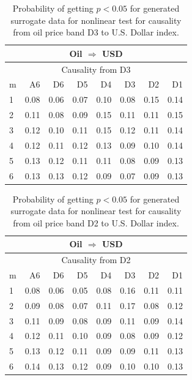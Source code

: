 %
%
\begin{table}[H]
\begin{center}
\begin{tabular}{l|r r r r r r r}
\hline\hline
\multicolumn{8}{c}{Oil $\Rightarrow$ USD}\\
\hline
\multicolumn{8}{c}{Causality from D3}\\
\hline\hline
m & A6 & D6 & D5 & D4 & D3 & D2 & D1 \\
\hline
1 & 0.08 & 0.06 & 0.07 & 0.10 & 0.08 & 0.15 & 0.14 \\
2 & 0.11 & 0.08 & 0.09 & 0.15 & 0.11 & 0.11 & 0.15 \\
3 & 0.12 & 0.10 & 0.11 & 0.15 & 0.12 & 0.11 & 0.14 \\
4 & 0.12 & 0.11 & 0.12 & 0.13 & 0.09 & 0.10 & 0.14 \\
5 & 0.13 & 0.12 & 0.11 & 0.11 & 0.08 & 0.09 & 0.13 \\
6 & 0.13 & 0.13 & 0.12 & 0.09 & 0.07 & 0.09 & 0.13 \\
\hline\hline
\end{tabular}
\caption{Probability of getting $p < 0.05$ for generated surrogate data for nonlinear test for causality from oil price band D3 to U.S. Dollar index.}
\end{center}
\end{table}

%
%
\begin{table}[H]
\begin{center}
\begin{tabular}{l|r r r r r r r}
\hline\hline
\multicolumn{8}{c}{Oil $\Rightarrow$ USD}\\
\hline
\multicolumn{8}{c}{Causality from D2}\\
\hline\hline
m & A6 & D6 & D5 & D4 & D3 & D2 & D1 \\
\hline
1 & 0.08 & 0.06 & 0.05 & 0.08 & 0.16 & 0.11 & 0.11 \\
2 & 0.09 & 0.08 & 0.07 & 0.11 & 0.17 & 0.08 & 0.12 \\
3 & 0.11 & 0.09 & 0.08 & 0.09 & 0.11 & 0.09 & 0.14 \\
4 & 0.12 & 0.11 & 0.10 & 0.09 & 0.08 & 0.09 & 0.12 \\
5 & 0.13 & 0.12 & 0.11 & 0.09 & 0.09 & 0.11 & 0.13 \\
6 & 0.14 & 0.13 & 0.12 & 0.09 & 0.10 & 0.10 & 0.13 \\
\hline\hline
\end{tabular}
\caption{Probability of getting $p < 0.05$ for generated surrogate data for nonlinear test for causality from oil price band D2 to U.S. Dollar index.}
\end{center}
\end{table}

